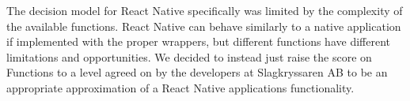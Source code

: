 The decision model for React Native specifically was limited by the complexity of the available functions. React Native can behave similarly to a native application if implemented with the proper wrappers, but different functions have different limitations and opportunities. We decided to instead just raise the score on Functions to a level agreed on by the developers at Slagkryssaren AB to be an appropriate approximation of a React Native applications functionality.
